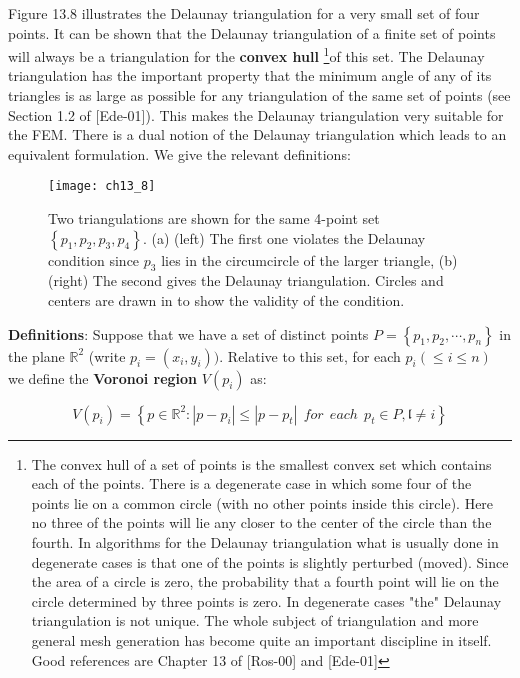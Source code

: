 \documentclass[../main.tex]{subfiles}
\begin{document}
Figure 13.8 illustrates the Delaunay triangulation for a very small set of four points. It can be shown that the Delaunay triangulation of a finite set of points will always be a triangulation for the \textbf{convex hull}
\footnote{The convex hull of a set of points is the smallest convex set which contains each of the points. There is a degenerate case in which some four of the points lie on a common circle (with no other points inside this circle). Here no three of the points will lie any closer to the center of the circle than the fourth. In algorithms for the Delaunay triangulation what is usually done in degenerate cases is that one of the points is slightly perturbed (moved). Since the area of a circle is zero, the probability that a fourth point will lie on the circle determined by three points is zero. In degenerate cases "the" Delaunay triangulation is not unique. The whole subject of triangulation and more general mesh generation has become quite an important discipline in itself. Good references are Chapter 13 of [Ros-00] and [Ede-01]}of this set. The Delaunay triangulation has the important property that the minimum angle of any of its triangles is as large as possible for any triangulation of the same set of points (see Section 1.2 of [Ede-01]). This makes the Delaunay triangulation very suitable for the FEM. There is a dual notion of the Delaunay triangulation which leads to an equivalent formulation. We give the relevant definitions: 

\begin{figure}[H]
	\centering
	\texttt{[image: ch13\_8]}
	\caption{\textsf{Two triangulations are shown for the same 4-point set $\left\{ p_1,p_2,p_3, p_4 \right\}$. (a) (left) The first one violates the Delaunay condition since $p_3$ lies in the circumcircle of the larger triangle, (b) (right) The second gives the Delaunay triangulation. Circles and centers are drawn in to show the validity of the condition. }}
	\label{pfig:ch13_8}
\end{figure}

\textbf{Definitions}: Suppose that we have a set of distinct points $P=\left\{ p_1,p_2, \cdots,p_n \right\}$ in the plane $\mathbb{R}^2$ (write $p_i=(x_i,y_i))$. Relative to this set, for each $p_i(\leqslant i \leqslant n)$ we define the \textbf{Voronoi region} $V(p_i)$ as: 

\begin{equation}\label{eqa9}
V(p_i)= \left\{ p \in \mathbb{R}^2 : |p-p_i| \leqslant |p-p_t|~~for~~each~~p_t \in P, \mathfrak{l} \neq i  \right\}
\end{equation}
\end{document}
